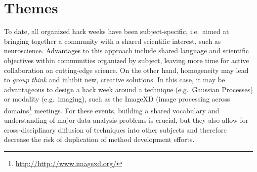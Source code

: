 \section*{Themes}

To date, all organized hack weeks have been subject-specific, i.e.\ aimed at bringing together a community with a shared scientific interest, such as neuroscience.
Advantages to this approach include shared language and scientific objectives within communities organized by subject, leaving more time for active collaboration on cutting-edge science.
On the other hand, homogeneity may lead to \textit{group think} and inhibit new, creative solutions. 
In this case, it may be advantageous to design a hack week around a technique (e.g.\ Gaussian Processes) or modality (e.g.\ imaging), such as the ImageXD (image processing across domains\footnote{\url{http://http://www.imagexd.org/}} meetings. 
For these events, building a shared vocabulary and understanding of major data analysis problems is crucial, but they also allow for cross-disciplinary diffusion of techniques into other subjects and therefore decrease the risk of duplication of method development efforts.